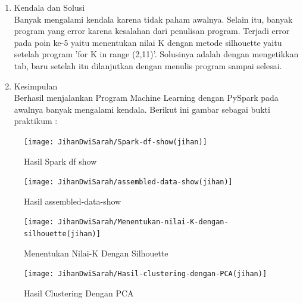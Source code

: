 
\begin{enumerate}
\item Kendala dan Solusi \\
Banyak mengalami kendala karena tidak paham awalnya. Selain itu, banyak program yang error karena kesalahan dari penulisan program. Terjadi error pada poin ke-5 yaitu menentukan nilai K dengan metode silhouette yaitu setelah program 'for K in range (2,11)'. Solusinya adalah dengan mengetikkan tab, baru setelah itu dilanjutkan dengan menulis program sampai selesai.

\item Kesimpulan  \\
Berhasil menjalankan Program Machine Learning dengan PySpark pada awalnya banyak mengalami kendala. Berikut ini gambar sebagai bukti praktikum : 
\end{enumerate}
\begin{figure}[!ht]
\texttt{[image: JihanDwiSarah/Spark-df-show(jihan)]}
\caption{Hasil Spark df show}
\label{gam:Spark-df-show(jihan)}
\end{figure}

\begin{figure}[!ht]
\texttt{[image: JihanDwiSarah/assembled-data-show(jihan)]}
\caption{Hasil assembled-data-show}
\label{gam:assembled-data-show(jihan)}
\end{figure}

\newpage
\begin{figure}[!ht]
\texttt{[image: JihanDwiSarah/Menentukan-nilai-K-dengan-silhouette(jihan)]}
\caption{Menentukan Nilai-K Dengan Silhouette}
\label{gam:Menentukan-nilai-K-dengan-silhouette(jihan)}
\end{figure}

\begin{figure}[!ht]
\texttt{[image: JihanDwiSarah/Hasil-clustering-dengan-PCA(jihan)]}
\caption{Hasil Clustering Dengan PCA}
\label{gam:Hasil-clustering-dengan-PCA(jihan)}
\end{figure}


